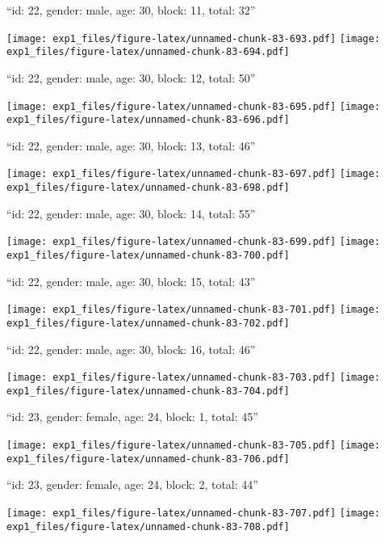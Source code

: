\documentclass[11pt,,]{article}
\begin{document}
\newpage
[1] 

``id: 22, gender: male, age: 30, block: 11, total: 32''

\texttt{[image: exp1\_files/figure-latex/unnamed-chunk-83-693.pdf]}
\texttt{[image: exp1\_files/figure-latex/unnamed-chunk-83-694.pdf]}

\newpage
[1] 

``id: 22, gender: male, age: 30, block: 12, total: 50''

\texttt{[image: exp1\_files/figure-latex/unnamed-chunk-83-695.pdf]}
\texttt{[image: exp1\_files/figure-latex/unnamed-chunk-83-696.pdf]}

\newpage
[1] 

``id: 22, gender: male, age: 30, block: 13, total: 46''

\texttt{[image: exp1\_files/figure-latex/unnamed-chunk-83-697.pdf]}
\texttt{[image: exp1\_files/figure-latex/unnamed-chunk-83-698.pdf]}

\newpage
[1] 

``id: 22, gender: male, age: 30, block: 14, total: 55''

\texttt{[image: exp1\_files/figure-latex/unnamed-chunk-83-699.pdf]}
\texttt{[image: exp1\_files/figure-latex/unnamed-chunk-83-700.pdf]}

\newpage
[1] 

``id: 22, gender: male, age: 30, block: 15, total: 43''

\texttt{[image: exp1\_files/figure-latex/unnamed-chunk-83-701.pdf]}
\texttt{[image: exp1\_files/figure-latex/unnamed-chunk-83-702.pdf]}

\newpage
[1] 

``id: 22, gender: male, age: 30, block: 16, total: 46''

\texttt{[image: exp1\_files/figure-latex/unnamed-chunk-83-703.pdf]}
\texttt{[image: exp1\_files/figure-latex/unnamed-chunk-83-704.pdf]}

\newpage
[1] 

``id: 23, gender: female, age: 24, block: 1, total: 45''

\texttt{[image: exp1\_files/figure-latex/unnamed-chunk-83-705.pdf]}
\texttt{[image: exp1\_files/figure-latex/unnamed-chunk-83-706.pdf]}

\newpage
[1] 

``id: 23, gender: female, age: 24, block: 2, total: 44''

\texttt{[image: exp1\_files/figure-latex/unnamed-chunk-83-707.pdf]}
\texttt{[image: exp1\_files/figure-latex/unnamed-chunk-83-708.pdf]}
\end{document}
